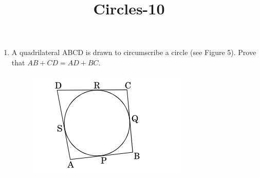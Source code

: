 \documentclass{article}
\begin{document}
\title{Circles-10}
\begin{enumerate}
	\item A quadrilateral ABCD is drawn to circumscribe a circle (see Figure 5). Prove that $AB + CD = AD + BC$.
		\begin{figure}[!htb]
		\centering
		\includegraphics{fig.png}
		

\end{figure}
\end{enumerate}
\end{document}
